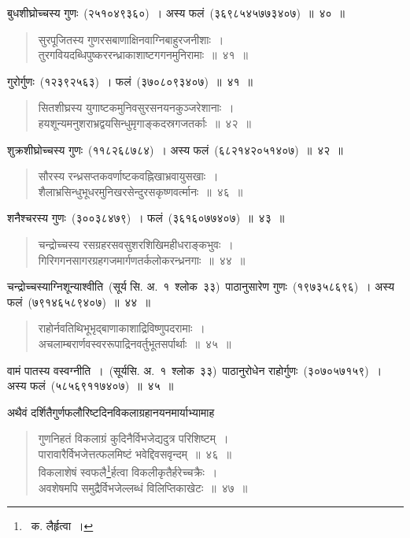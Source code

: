 \documentclass[11pt, openany]{book}
\begin{document}
\indent
बुधशीघ्रोच्चस्य गुणः~(२५१०४९३६०)~। अस्य फलं~(३६९८५४५७७३४०७)~॥~४०~॥

\newpage
\thispagestyle{fancy}
\fancyhf{}

\begin{quote}
{\ks सुरपूजितस्य गुणरसबाणाक्षिनवाग्निबाहुरजनीशाः~।\\
तुरगवियदब्धिपुष्कररन्ध्राकाशाष्टगगनमुनिरामाः~॥~४१~॥}
\end{quote}

\indent
गुरोर्गुणः~(१२३९२५६३)~। फलं~(३७०८०९३४०७)~॥~४१~॥

\begin{quote}
{\ks सितशीघ्रस्य युगाष्टकमुनिवसुरसनयनकुञ्जरेशानाः~।\\
हयशून्यमनुशराभ्रद्वयसिन्धुमृगाङ्कदस्रगजतर्काः~॥~४२~॥}
\end{quote}

\indent
शुक्रशीघ्रोच्चस्य गुणः~(११८२६८७८४)~। अस्य फलं~(६८२१४२०५१४०७)~॥~४२~॥

\begin{quote}
{\ks सौरस्य रन्ध्रसप्तकवर्णाष्टकवह्निखाभ्रवायुसखाः~।\\
शैलाभ्रसिन्धुभूधरमुनिखरसेन्दुरसकृष्णवर्त्मानः~॥~४६~॥}
\end{quote}

\indent
शनैश्चरस्य गुणः~(३००३८४७९)~। फलं~(३६१६०७७४०७)~॥~४३~॥

\begin{quote}
{\ks चन्द्रोच्चस्य रसग्रहरसवसुशरशिखिमहीधराङ्कभुवः~।\\
गिरिगगनसागरग्रहगजमार्गणतर्कलोकरन्ध्रनगाः~॥~४४~॥}
\end{quote}

\indent
चन्द्रोच्चस्याग्निशून्याश्वीति~(सूर्य सि. अ.~१~श्लोक~३३)~पाठानुसारेण गुणः~(१९७३५८६९६)~। अस्य फलं~(७९१४६५८९४०७)~॥~४४~॥

\begin{quote}
{\ks राहोर्नवतिथिभूभृद्बाणाकाशाद्रिविष्णुपदरामाः~।\\
अचलाम्बरार्णवस्वररूपाद्रिनवर्तुभूतसर्पार्थाः~॥~४५~॥}
\end{quote}

\indent
वामं पातस्य वस्वग्नीति~।~(सूर्यसि. अ.~१~श्लोक~३३)~पाठानुरोधेन राहोर्गुणः~(३०७०५७१५९)~। अस्य फलं~(५८५६९११७४०७)~॥~४५~॥

\indent
अथैवं दर्शितैगुर्णफलौरिष्टदिनविकलाग्रहानयनमार्याभ्यामाह\textendash

\begin{quote}
{\ks गुणनिहतं विकलाग्रं कुदिनैर्विभजेद्यदुत्र परिशिष्टम्~।\\
पारावारैर्विभजेत्तत्फलमिष्टं भवेद्दिवसवृन्दम्~॥~४६~॥\\
विकलाशेषं स्वफलै\renewcommand\thefootnote{१}\footnote{~क. लैर्हृत्वा~।}र्हत्वा विकलीकृतैर्हरेच्चक्रैः~।\\
अवशेषमपि समुद्रैर्विभजेल्लब्धं विलिप्तिकाखेटः~॥~४७~॥}
\end{quote}
\end{document}
